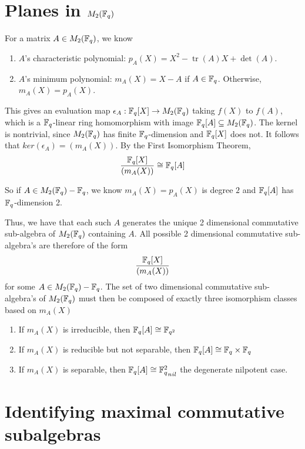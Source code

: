\documentclass{amsart}
\begin{document}
\section{Planes in $M_2(\protect\mathbb{F}_q)$}
    For a matrix $A \in M_2(\protect\mathbb{F}_q)$, we know
    \begin{enumerate}
        \item $A$'s characteristic polynomial: $p_A(X) = X^2 -\operatorname{tr}(A)X + \det(A)$.
        \item $A$'s minimum polynomial: $m_A(X) = X - A$ if $A \in \protect\mathbb{F}_q$. Otherwise, $m_A(X) = p_A(X)$.
    \end{enumerate}

    This gives an evaluation map $\epsilon_A : \protect\mathbb{F}_q[X] \rightarrow M_2(\protect\mathbb{F}_q)$ taking $f(X)$ to $f(A)$, which is a $\protect\mathbb{F}_q$-linear ring homomorphism with image $\protect\mathbb{F}_q[A] \subseteq M_2(\protect\mathbb{F}_q)$. The kernel is nontrivial, since $M_2(\protect\mathbb{F}_q)$ has finite $\protect\mathbb{F}_q$-dimension and $\protect\mathbb{F}_q[X]$ does not. It follows that $ker(\epsilon_A) = (m_A(X))$. By the First Isomorphism Theorem,
    \begin{align*}
        \frac{\protect\mathbb{F}_q[X]}{(m_A(X))} \cong \protect\mathbb{F}_q[A]
    \end{align*}

    So if $A \in M_2(\protect\mathbb{F}_q) - \protect\mathbb{F}_q$, we know $m_A(X) = p_A(X)$ is degree $2$ and $\protect\mathbb{F}_q[A]$ has $\protect\mathbb{F}_q$-dimension 2.

    Thus, we have that each such $A$ generates the unique 2 dimensional commutative sub-algebra of $M_2(\protect\mathbb{F}_q)$ containing $A$. All possible 2 dimensional commutative sub-algebra's are therefore of the form
    \begin{align*}
        \frac{\protect\mathbb{F}_q[X]}{(m_A(X))}
    \end{align*}
    for some $A \in M_2(\protect\mathbb{F}_q) - \protect\mathbb{F}_q$. The set of two dimensional commutative sub-algebra's of $M_2(\protect\mathbb{F}_q)$ must then be composed of exactly three isomorphism classes based on $m_A(X)$
    \begin{enumerate}
        \item If $m_A(X)$ is irreducible, then $\protect\mathbb{F}_q[A] \cong \protect\mathbb{F}_{q^2}$
        \item If $m_A(X)$ is reducible but not separable, then $\protect\mathbb{F}_q[A] \cong \protect\mathbb{F}_q \times \protect\mathbb{F}_q$
        \item If $m_A(X)$ is separable, then $\bF_q[A] \cong {\bF_q^2}_{nil}$ the degenerate nilpotent case.
    \end{enumerate}

    

\section{Identifying maximal commutative subalgebras}
\end{document}
